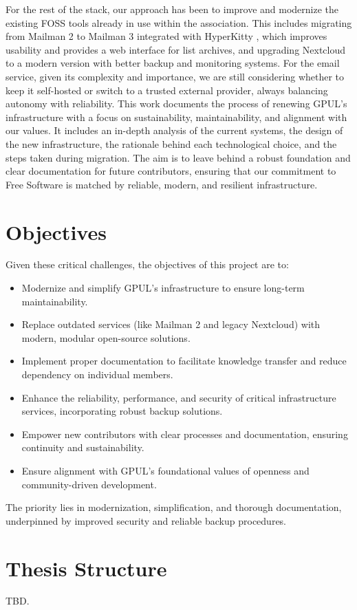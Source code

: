 For the rest of the stack, our approach has been to improve and modernize the existing FOSS tools already in use within the association. This includes migrating from Mailman 2 to Mailman 3 integrated with HyperKitty \cite{hyperkitty_web}, which improves usability and provides a web interface for list archives, and upgrading Nextcloud to a modern version with better backup and monitoring systems. For the email service, given its complexity and importance, we are still considering whether to keep it self-hosted or switch to a trusted external provider, always balancing autonomy with reliability.
This work documents the process of renewing GPUL's infrastructure with a focus on sustainability, maintainability, and alignment with our values. It includes an in-depth analysis of the current systems, the design of the new infrastructure, the rationale behind each technological choice, and the steps taken during migration. The aim is to leave behind a robust foundation and clear documentation for future contributors, ensuring that our commitment to Free Software is matched by reliable, modern, and resilient infrastructure.

\section{Objectives}

Given these critical challenges, the objectives of this project are to:

\begin{itemize}
    \item Modernize and simplify GPUL's infrastructure to ensure long-term maintainability.
    \item Replace outdated services (like Mailman 2 and legacy Nextcloud) with modern, modular open-source solutions.
    \item Implement proper documentation to facilitate knowledge transfer and reduce dependency on individual members.
    \item Enhance the reliability, performance, and security of critical infrastructure services, incorporating robust backup solutions.
    \item Empower new contributors with clear processes and documentation, ensuring continuity and sustainability.
    \item Ensure alignment with GPUL's foundational values of openness and community-driven development.
\end{itemize}

The priority lies in modernization, simplification, and thorough documentation, underpinned by improved security and reliable backup procedures.

\section{Thesis Structure}

TBD.
